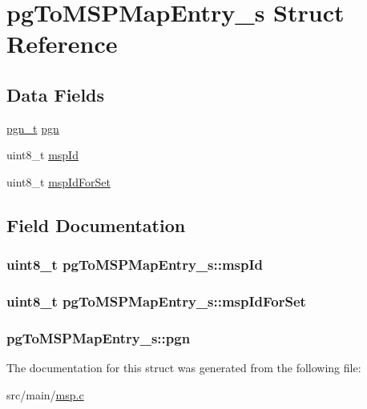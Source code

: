 \hypertarget{structpgToMSPMapEntry__s}{\section{pg\+To\+M\+S\+P\+Map\+Entry\+\_\+s Struct Reference}
\label{structpgToMSPMapEntry__s}
}
\subsection*{Data Fields}
\begin{DoxyCompactItemize}
\item 
\hyperlink{parameter__group_8h_ae7ed3d45ee3ac53fa92a8df996ff5f97}{pgn\+\_\+t} \hyperlink{structpgToMSPMapEntry__s_a349331eaa3b912b971ea815759acd09f}{pgn}
\item 
uint8\+\_\+t \hyperlink{structpgToMSPMapEntry__s_a3c68c3960c0102561c759a9e8cbface8}{msp\+Id}
\item 
uint8\+\_\+t \hyperlink{structpgToMSPMapEntry__s_ab19f461e2a1583370dfc2244cedb68c3}{msp\+Id\+For\+Set}
\end{DoxyCompactItemize}


\subsection{Field Documentation}
\hypertarget{structpgToMSPMapEntry__s_a3c68c3960c0102561c759a9e8cbface8}{
\subsubsection[{msp\+Id}]{\setlength{\rightskip}{0pt plus 5cm}uint8\+\_\+t pg\+To\+M\+S\+P\+Map\+Entry\+\_\+s\+::msp\+Id}}\label{structpgToMSPMapEntry__s_a3c68c3960c0102561c759a9e8cbface8}
\hypertarget{structpgToMSPMapEntry__s_ab19f461e2a1583370dfc2244cedb68c3}{
\subsubsection[{msp\+Id\+For\+Set}]{\setlength{\rightskip}{0pt plus 5cm}uint8\+\_\+t pg\+To\+M\+S\+P\+Map\+Entry\+\_\+s\+::msp\+Id\+For\+Set}}\label{structpgToMSPMapEntry__s_ab19f461e2a1583370dfc2244cedb68c3}
\hypertarget{structpgToMSPMapEntry__s_a349331eaa3b912b971ea815759acd09f}{
\subsubsection[{pgn}]{ pg\+To\+M\+S\+P\+Map\+Entry\+\_\+s\+::pgn}}\label{structpgToMSPMapEntry__s_a349331eaa3b912b971ea815759acd09f}


The documentation for this struct was generated from the following file\+:\begin{DoxyCompactItemize}
\item 
src/main/\hyperlink{msp_8c}{msp.\+c}\end{DoxyCompactItemize}
